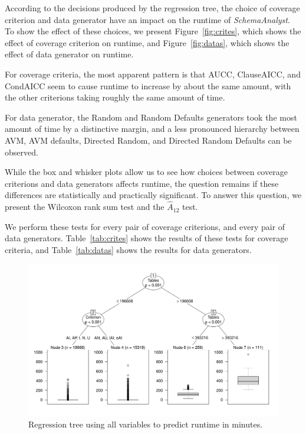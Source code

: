 According to the decisions produced by the regression tree, the choice
of coverage criterion and data generator have an impact on the runtime
of \textit{SchemaAnalyst}. To show the effect of these choices, we
present Figure~\ref{fig:crites}, which shows the effect of coverage
criterion on runtime, and Figure~\ref{fig:datas}, which shows the effect
of data generator on runtime.  

For coverage criteria, the most apparent pattern is that AUCC,
ClauseAICC, and CondAICC seem to cause runtime to increase by about the
same amount, with the other criterions taking roughly the same amount of
time.

For data generator, the Random and Random Defaults generators took the
most amount of time by a distinctive margin, and a less pronounced
hierarchy between AVM, AVM defaults, Directed Random, and Directed
Random Defaults can be observed.  

While the box and whisker plots allow us to see how choices between
coverage criterions and data generators affects runtime, the question
remains if these differences are statistically and practically
significant. To answer this question, we present the Wilcoxon rank sum
test and the $\hat{A}_{12}$ test.  


We perform these tests for every pair
of coverage criterions, and every pair of data generators.
Table~\ref{tab:crites} shows the results of these tests for coverage
criteria, and Table~\ref{tab:datas} shows the results for data
generators.

\begin{figure}
\centering
  \centering
  \includegraphics[width=.75\linewidth]{diagrams/AllTree.pdf}
  \caption{Regression tree using all variables to predict runtime in
  minutes. \vspace{-.15in}}
  \label{fig:atree}
  \vspace{-.15in} 
\end{figure}

